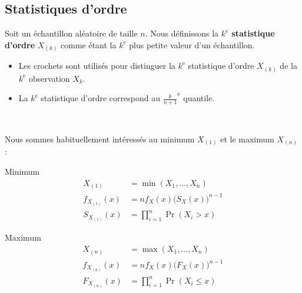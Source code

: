 \documentclass[10pt, french]{article}
\begin{document}
\begin{multicols*}{2}
\newpage
\section{Statistiques d'ordre} \label{sec:orderStats}

Soit un échantillon aléatoire de taille $n$.
Nous définissons la \textbf{$k^{\text{e}}$ statistique d'ordre} $X_{(k)}$ comme étant la $k^{\text{e}}$ plus petite valeur d'un échantillon.
\begin{itemize}
	\item	Les crochets sont utilisés pour distinguer la $k^{\text{e}}$ statistique d'ordre $X_{(k)}$ de la $k^{\text{e}}$ observation $X_{k}$.
	\item	La $k^{\text{e}}$ statistique d'ordre correspond au $\frac{k}{n + 1}^{\text{e}}$ quantile.
\end{itemize}

\

Nous sommes habituellement intéressés au minimum $X_{(1)}$ et le maximum $X_{(n)}$ :

\setlength{\mathindent}{-0.75cm}
\begin{minipage}{0.5\columnwidth}
\begin{algo}{Minimum}
\begin{align*}
	X_{(1)}
	&=	\min(X_{1}, \dots, X_{n})	\\
	f_{X_{(1)}}(x)
	&=	n f_{X}(x) \big( S_{X}(x) \big)^{n - 1}	\\
	S_{X_{(1)}}(x)
	&=	\prod_{i = 1}^{n} \Pr(X_{i} > x)
\end{align*}
\end{algo}
\end{minipage}
\begin{minipage}{0.5\columnwidth}
\begin{algo}{Maximum}
\begin{align*}
	X_{(n)}
	&=	\max(X_{1}, \dots, X_{n})	\\
	f_{X_{(n)}}(x)
	&=	n f_{X}(x) \big( F_{X}(x) \big)^{n - 1}	\\
	F_{X_{(n)}}(x)
	&=	\prod_{i = 1}^{n} \Pr(X_{i} \le x)
\end{align*}
\end{algo}
\end{minipage}
\setlength{\mathindent}{1cm}


\end{multicols*}
\end{document}
